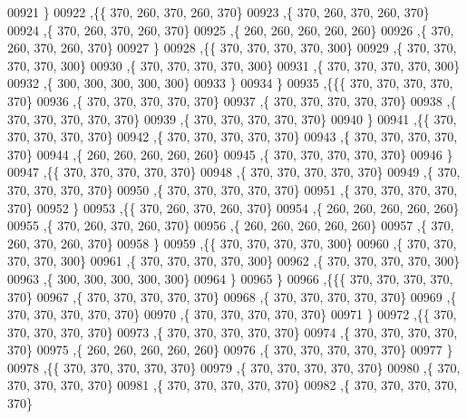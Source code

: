 \begin{DoxyCode}
00921    \}
00922   ,\{\{   370,   260,   370,   260,   370\}
00923    ,\{   370,   260,   370,   260,   370\}
00924    ,\{   370,   260,   370,   260,   370\}
00925    ,\{   260,   260,   260,   260,   260\}
00926    ,\{   370,   260,   370,   260,   370\}
00927    \}
00928   ,\{\{   370,   370,   370,   370,   300\}
00929    ,\{   370,   370,   370,   370,   300\}
00930    ,\{   370,   370,   370,   370,   300\}
00931    ,\{   370,   370,   370,   370,   300\}
00932    ,\{   300,   300,   300,   300,   300\}
00933    \}
00934   \}
00935  ,\{\{\{   370,   370,   370,   370,   370\}
00936    ,\{   370,   370,   370,   370,   370\}
00937    ,\{   370,   370,   370,   370,   370\}
00938    ,\{   370,   370,   370,   370,   370\}
00939    ,\{   370,   370,   370,   370,   370\}
00940    \}
00941   ,\{\{   370,   370,   370,   370,   370\}
00942    ,\{   370,   370,   370,   370,   370\}
00943    ,\{   370,   370,   370,   370,   370\}
00944    ,\{   260,   260,   260,   260,   260\}
00945    ,\{   370,   370,   370,   370,   370\}
00946    \}
00947   ,\{\{   370,   370,   370,   370,   370\}
00948    ,\{   370,   370,   370,   370,   370\}
00949    ,\{   370,   370,   370,   370,   370\}
00950    ,\{   370,   370,   370,   370,   370\}
00951    ,\{   370,   370,   370,   370,   370\}
00952    \}
00953   ,\{\{   370,   260,   370,   260,   370\}
00954    ,\{   260,   260,   260,   260,   260\}
00955    ,\{   370,   260,   370,   260,   370\}
00956    ,\{   260,   260,   260,   260,   260\}
00957    ,\{   370,   260,   370,   260,   370\}
00958    \}
00959   ,\{\{   370,   370,   370,   370,   300\}
00960    ,\{   370,   370,   370,   370,   300\}
00961    ,\{   370,   370,   370,   370,   300\}
00962    ,\{   370,   370,   370,   370,   300\}
00963    ,\{   300,   300,   300,   300,   300\}
00964    \}
00965   \}
00966  ,\{\{\{   370,   370,   370,   370,   370\}
00967    ,\{   370,   370,   370,   370,   370\}
00968    ,\{   370,   370,   370,   370,   370\}
00969    ,\{   370,   370,   370,   370,   370\}
00970    ,\{   370,   370,   370,   370,   370\}
00971    \}
00972   ,\{\{   370,   370,   370,   370,   370\}
00973    ,\{   370,   370,   370,   370,   370\}
00974    ,\{   370,   370,   370,   370,   370\}
00975    ,\{   260,   260,   260,   260,   260\}
00976    ,\{   370,   370,   370,   370,   370\}
00977    \}
00978   ,\{\{   370,   370,   370,   370,   370\}
00979    ,\{   370,   370,   370,   370,   370\}
00980    ,\{   370,   370,   370,   370,   370\}
00981    ,\{   370,   370,   370,   370,   370\}
00982    ,\{   370,   370,   370,   370,   370\}

\end{DoxyCode}
